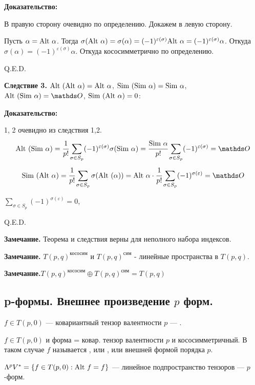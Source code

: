 \textbf{Доказательство:}

В правую сторону очевидно по определению. Докажем в левую сторону.

Пусть $\alpha = \text{Alt } \alpha$. Тогда $\sigma(\text{Alt } \alpha) = \sigma(\alpha) = (-1)^{\varepsilon(\sigma)}\text{Alt } \alpha = (-1)^{\varepsilon(\sigma)}\alpha$. Откуда $\sigma(\alpha) = (-1)^{\varepsilon(\sigma)} \alpha$. Откуда кососимметрично по определению.

\hfill Q.E.D.

\textbf{Следствие 3.} $\text{Alt }(\text{Alt } \alpha) = \text{Alt } \alpha$, $\text{Sim }(\text{Sim } \alpha) = \text{Sim } \alpha$, $\Alt(\Sim \alpha) = \zero$, $\text{Sim }(\text{Alt } \alpha) = 0$:

\textbf{Доказательство:}

1, 2 очевидно из следствия 1,2.
$$\Alt(\Sim \alpha) = \cfrac{1}{p!}\sum\limits_{\sigma \in S_p}(-1)^{\varepsilon(\sigma)}\sigma(\Sim \alpha) = \cfrac{\Sim \alpha}{p!}\sum\limits_{\sigma \in S_p}(-1)^{\varepsilon(\sigma)} = \zero$$
$$\Sim (\Alt \alpha) = \cfrac{1}{p!}\sum\limits_{\sigma \in S_p}\sigma(\Alt(\alpha)) = \Alt\alpha \cdot \cfrac{1}{p!}\sum\limits_{\sigma \in S_p} (-1)^{\sigma(\varepsilon)} =\zero$$

$\sum\limits_{\sigma \in S_p} (-1)^{\sigma(\varepsilon)} = 0$,  

\hfill Q.E.D.

\textbf{Замечание.} Теорема и следствия верны для неполного набора индексов.

\textbf{Замечание.} $T(p,q)^{\text{кососим}}$ и  $T(p,q)^{\text{сим}}$ - линейные пространства в $T(p,q)$.

\textbf{Замечание.}$T(p,q)^{\text{кососим}} \oplus T(p,q)^{\text{сим}} = T(p,q)$

\pagebreak

\subsection{p-формы. Внешнее произведение $p$ форм.}

 $f \in T(p,0)$ --- ковариантный тензор валентности $p$ --- .

$f \in T(p,0)$ и  форма = ковар. тензор валентности $p$ и кососимметричный. В таком случае $f$ называется , или , или внешней формой порядка $p$. 

$\Lambda^pV^* = \{f \in T(p,0): \text{Alt } f = f\}$ --- линейное подпространство тензоров ---  $p$-форм.

